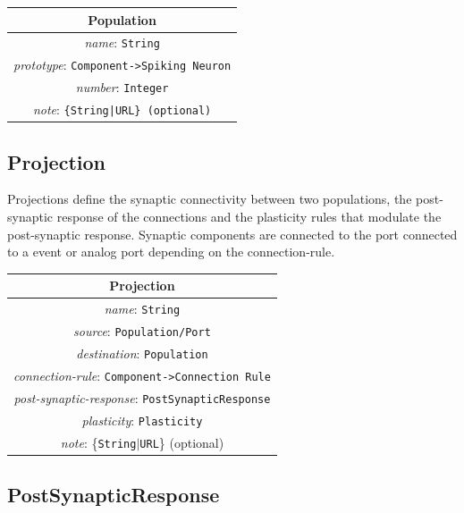 \documentclass{article}
\begin{document}
\begin{table}[htb]
\center
\begin{tabular}{|c|}
\hline
\hline
Population \\
\hline
\hline
{\em name}: {\tt String} \\
\hline
{\em prototype}: {\tt Component->Spiking Neuron} \\
\hline
{\em number}: {\tt Integer}\\
\hline
{\em note}: {\tt \{String|URL\} (optional)} \\
\hline
\end{tabular}
\end{table}

\newpage

\subsection{Projection}
\label{projections}

Projections define the synaptic connectivity between two populations, the post-synaptic response of the connections and the plasticity rules that modulate the post-synaptic response. Synaptic components are connected to the port  connected to a event or analog port depending on the connection-rule.

\begin{table}[htb]
\center
\begin{tabular}{|c|}
\hline
\hline
Projection \\
\hline
\hline
{\em name}: {\tt String} \\
\hline
{\em source}: {\tt Population/Port} \\
\hline
{\em destination}: {\tt Population} \\
\hline
{\em connection-rule}: {\tt Component->Connection Rule} \\
\hline
{\em post-synaptic-response}: {\tt PostSynapticResponse} \\
\hline
{\em plasticity}: {\tt Plasticity} \\
\hline
{\em note}: \{{\tt String}$|${\tt URL}\} (optional)\\
\hline
\end{tabular}
\end{table}

\subsection{PostSynapticResponse}
\label{postsynapticresponse}
\end{document}
